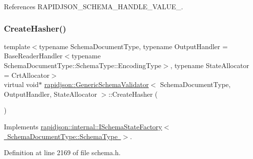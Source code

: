 References R\+A\+P\+I\+D\+J\+S\+O\+N\+\_\+\+S\+C\+H\+E\+M\+A\+\_\+\+H\+A\+N\+D\+L\+E\+\_\+\+V\+A\+L\+U\+E\+\_\+.

\mbox{\label{classrapidjson_1_1_generic_schema_validator_aec2362f03fb6edc575d9bb50d4f99c94}} 
\subsubsection{\texorpdfstring{CreateHasher()}{CreateHasher()}}
{\footnotesize\ttfamily template$<$typename Schema\+Document\+Type, typename Output\+Handler = Base\+Reader\+Handler$<$typename Schema\+Document\+Type\+::\+Schema\+Type\+::\+Encoding\+Type$>$, typename State\+Allocator = Crt\+Allocator$>$ \\
virtual void$\ast$ \mbox{\hyperlink{classrapidjson_1_1_generic_schema_validator}{rapidjson\+::\+Generic\+Schema\+Validator}}$<$ Schema\+Document\+Type, Output\+Handler, State\+Allocator $>$\+::Create\+Hasher (\begin{DoxyParamCaption}{ }\end{DoxyParamCaption})\hspace{0.3cm}{\ttfamily [virtual]}}



Implements \mbox{\hyperlink{classrapidjson_1_1internal_1_1_i_schema_state_factory_a399e25fa32d89a112518edbd8f9a9616}{rapidjson\+::internal\+::\+I\+Schema\+State\+Factory$<$ Schema\+Document\+Type\+::\+Schema\+Type $>$}}.



Definition at line 2169 of file schema.\+h.



